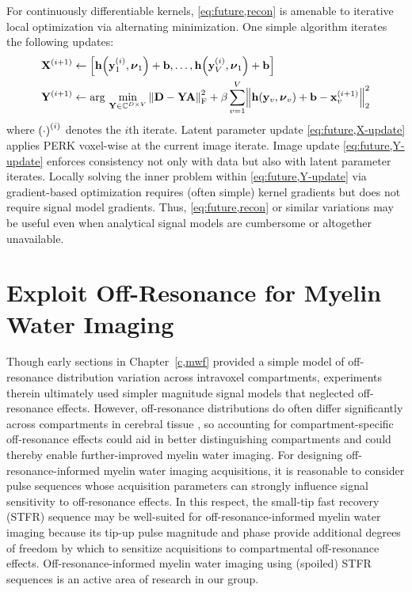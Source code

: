 For continuously differentiable kernels,
\eqref{eq:future,recon} is amenable 
to iterative local optimization 
via alternating minimization.
One simple algorithm iterates
the following updates:
\begin{align}
	\iter{\bmX}{i+1} &\gets
		\brac{%
			\bmh\paren{\iter{\bmy}{i}_1,\bmnu_1}+\bmb,
			\dots,
			\bmh\paren{\iter{\bmy}{i}_V,\bmnu_1}+\bmb
		}%
		\label{eq:future,X-update}
		\\
	\iter{\bmY}{i+1} &\gets
		\argmin{%
			\bmY \in \complexes{D \times V}
		}%
		\frob{\bmD-\bmY\bmA}^2 + 
			\beta \sum_{v=1}^V \norm{%
				\bmh\paren{\bmy_v,\bmnu_v}+\bmb-\iter{\bmx}{i+1}_v
			}^2_2%
		\label{eq:future,Y-update}		
\end{align}
where $\iter{\paren{\cdot}}{i}$ denotes the $i$th iterate.
Latent parameter update \eqref{eq:future,X-update}
applies PERK voxel-wise
at the current image iterate.
Image update \eqref{eq:future,Y-update}
enforces consistency 
not only with data
but also with latent parameter iterates.
Locally solving the inner problem 
within \eqref{eq:future,Y-update}
via gradient-based optimization
requires (often simple) kernel gradients
but does not require signal model gradients.
Thus, 
\eqref{eq:future,recon} or similar variations
may be useful even when analytical signal models
are cumbersome or altogether unavailable.

\section{Exploit Off-Resonance for Myelin Water Imaging}
\label{s,future,off-res}

Though early sections in Chapter~\ref{c,mwf} 
provided a simple model  
of off-resonance distribution variation 
across intravoxel compartments,
experiments therein 
ultimately used simpler magnitude signal models
that neglected off-resonance effects.
However,
off-resonance distributions
do often differ significantly 
across compartments
in cerebral tissue \cite{miller:10:aot-1,miller:10:aot-2},
so accounting for compartment-specific off-resonance effects
could aid in better distinguishing compartments
and could thereby enable further-improved myelin water imaging.
For designing off-resonance-informed myelin water imaging acquisitions,
it is reasonable
to consider pulse sequences
whose acquisition parameters
can strongly influence signal sensitivity 
to off-resonance effects.
In this respect,
the small-tip fast recovery (STFR) sequence \cite{nielsen:13:stf}
may be well-suited for off-resonance-informed myelin water imaging
because its tip-up pulse magnitude and phase
provide additional degrees of freedom
by which to sensitize acquisitions
to compartmental off-resonance effects.
Off-resonance-informed myelin water imaging
using (spoiled) STFR sequences
is an active area of research 
in our group.

